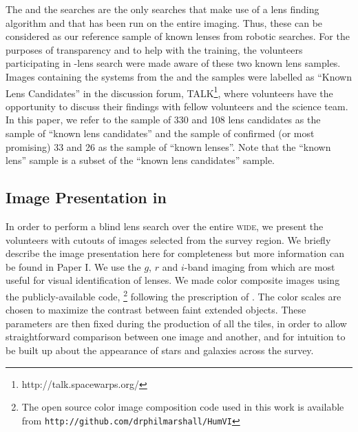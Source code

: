 \documentclass[useAMS,usenatbib,a4paper]{mn2e}
\begin{document}
The \rf and the \af searches are the only searches that make use of a
lens finding algorithm and that has been run on the entire \cfhtls
imaging.  Thus, these can be considered as our reference sample of known
lenses from robotic searches. For the purposes of transparency and to
help with the training, the volunteers participating in \sw-\cfhtls lens
search were made aware of these two known lens samples. Images
containing the systems from the \rf and the \af samples were labelled as
``Known Lens Candidates'' in the \sw discussion forum,
TALK\footnote{http://talk.spacewarps.org/}, where volunteers have the
opportunity to discuss their findings with fellow volunteers and the
science team. In this paper, we refer to the sample of 330 \rf and 108
\af lens candidates as the sample of ``known lens candidates'' and the
sample of confirmed (or most promising) 33 \rf and 26 \af as the sample
of ``known lenses''. Note that the ``known lens'' sample is a subset of
the ``known lens candidates'' sample.


\subsection{Image Presentation in \sw}
\label{sec:data:impres}

In order to perform a blind lens search over the entire \cfhtls
\textsc{wide}, we present the volunteers with cutouts of images selected
from the survey region. We briefly describe the image presentation here
for completeness but more information can be found in Paper I. We use
the $g$, $r$ and $i$-band imaging from \cfhtls which are most useful for
visual identification of lenses.  We made color composite images using
the publicly-available code, \humvi\footnote{The open source  color image
composition code used in this work is available from
\texttt{http://github.com/drphilmarshall/HumVI}} following the
prescription of \citet{Lupton2004}. The color scales are chosen to
maximize the contrast between faint extended objects. These parameters
are then fixed during the production of all the tiles, in order to allow
straightforward comparison between one image and another, and for
intuition to be built up about the appearance of stars and galaxies
across the survey.
\end{document}
